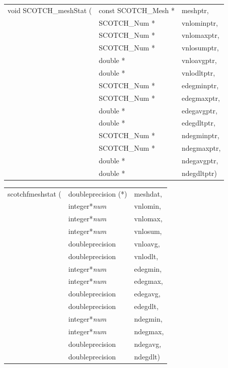 \begin{itemize}
\progsyn

{\tt\begin{tabular}{l@{}ll}
void SCOTCH\_meshStat ( & const SCOTCH\_Mesh * & meshptr, \\
                        & SCOTCH\_Num *        & vnlominptr, \\
                        & SCOTCH\_Num *        & vnlomaxptr, \\
                        & SCOTCH\_Num *        & vnlosumptr, \\
                        & double *             & vnloavgptr, \\
                        & double *             & vnlodltptr, \\
                        & SCOTCH\_Num *        & edegminptr, \\
                        & SCOTCH\_Num *        & edegmaxptr, \\
                        & double *             & edegavgptr, \\
                        & double *             & edegdltptr, \\
                        & SCOTCH\_Num *        & ndegminptr, \\
                        & SCOTCH\_Num *        & ndegmaxptr, \\
                        & double *             & ndegavgptr, \\
                        & double *             & ndegdltptr)
\end{tabular}}

{\tt\begin{tabular}{l@{}ll}
scotchfmeshstat ( & doubleprecision (*) & meshdat, \\
                  & integer*{\it num}   & vnlomin, \\
                  & integer*{\it num}   & vnlomax, \\
                  & integer*{\it num}   & vnlosum, \\
                  & doubleprecision     & vnloavg, \\
                  & doubleprecision     & vnlodlt, \\
                  & integer*{\it num}   & edegmin, \\
                  & integer*{\it num}   & edegmax, \\
                  & doubleprecision     & edegavg, \\
                  & doubleprecision     & edegdlt, \\
                  & integer*{\it num}   & ndegmin, \\
                  & integer*{\it num}   & ndegmax, \\
                  & doubleprecision     & ndegavg, \\
                  & doubleprecision     & ndegdlt)
\end{tabular}}


\end{itemize}
